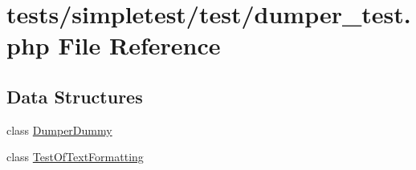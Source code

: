 \hypertarget{dumper__test_8php}{\section{tests/simpletest/test/dumper\-\_\-test.php File Reference}
\label{dumper__test_8php}
}
\subsection*{Data Structures}
\begin{DoxyCompactItemize}
\item 
class \hyperlink{class_dumper_dummy}{Dumper\-Dummy}
\item 
class \hyperlink{class_test_of_text_formatting}{Test\-Of\-Text\-Formatting}
\end{DoxyCompactItemize}
